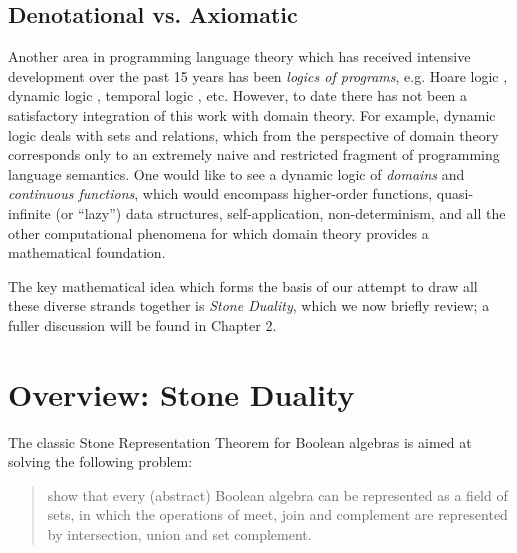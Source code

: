 \subsection*{Denotational vs. Axiomatic}
Another area in programming language theory which has received intensive 
development over the past 15 years has been {\em logics of programs}, 
e.g. Hoare logic \cite{Hoa69,deB80}, dynamic logic \cite{Pra79,Har79}, temporal logic \cite{Pnu77}, etc.
However, to date there has not been a satisfactory integration of this work with domain theory.
For example, dynamic logic deals with sets and relations, which from the perspective of domain theory corresponds only to an extremely naive and restricted fragment of programming language semantics.
One would like to see a dynamic logic of {\em domains} and {\em continuous functions}, which would encompass higher-order functions, quasi-infinite (or ``lazy'') data structures, self-application, non-determinism, and all the other computational phenomena for which domain theory provides a mathematical foundation.

The key mathematical idea which forms the basis of our attempt to draw all these diverse strands together is {\em Stone Duality}, which we now briefly review; a fuller discussion will be found in Chapter 2.
\section{Overview: Stone Duality}
The classic Stone Representation Theorem for Boolean algebras \cite{Sto36} 
is aimed at solving the following problem: 
\begin{quote}
show that every (abstract) Boolean algebra can be represented as a field of 
sets, in which the operations of meet, join and complement are represented by 
intersection, union and set complement.
\end{quote}

